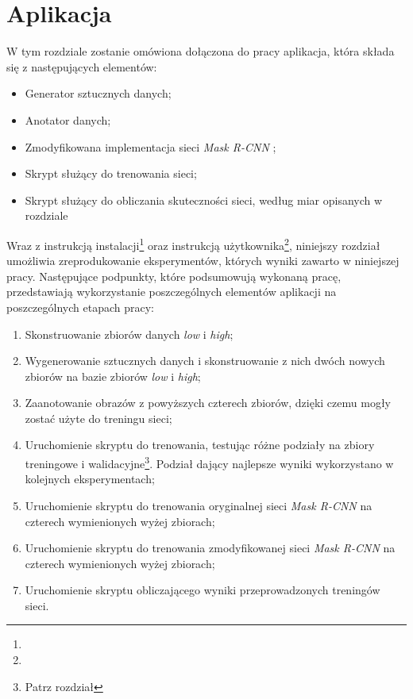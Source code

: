 \chapter{Aplikacja}
\label{sec:aplikacja}
W tym rozdziale zostanie omówiona dołączona do pracy aplikacja, która składa się z następujących elementów:
\begin{itemize}
  \item Generator sztucznych danych;
  \item Anotator danych;
  \item Zmodyfikowana implementacja sieci \textit{Mask R-CNN} \cite{matterport-mask-rcnn};
  \item Skrypt służący do trenowania sieci;
  \item Skrypt służący do obliczania skuteczności sieci, według miar opisanych w rozdziale 
\end{itemize}

Wraz z instrukcją instalacji\footnote{} oraz instrukcją użytkownika\footnote{}, niniejszy rozdział umożliwia zreprodukowanie eksperymentów, których wyniki zawarto w niniejszej pracy.
Następujące podpunkty, które podsumowują wykonaną pracę, przedstawiają wykorzystanie poszczególnych elementów aplikacji na poszczególnych etapach pracy:

\begin{enumerate}
 \item Skonstruowanie zbiorów danych \textit{low} i \textit{high};
 \item Wygenerowanie sztucznych danych i skonstruowanie z nich dwóch nowych zbiorów na bazie zbiorów \textit{low} i \textit{high};
 \item Zaanotowanie obrazów z powyższych czterech zbiorów, dzięki czemu mogły zostać użyte do treningu sieci;
 \item Uruchomienie skryptu do trenowania, testując różne podziały na zbiory treningowe i walidacyjne\footnote{Patrz rozdział }. Podział dający najlepsze wyniki wykorzystano w kolejnych eksperymentach;
 \item Uruchomienie skryptu do trenowania oryginalnej sieci \textit{Mask R-CNN} na czterech wymienionych wyżej zbiorach;
 \item Uruchomienie skryptu do trenowania zmodyfikowanej sieci \textit{Mask R-CNN} na czterech wymienionych wyżej zbiorach;
 \item Uruchomienie skryptu obliczającego wyniki przeprowadzonych treningów sieci.
\end{enumerate}



